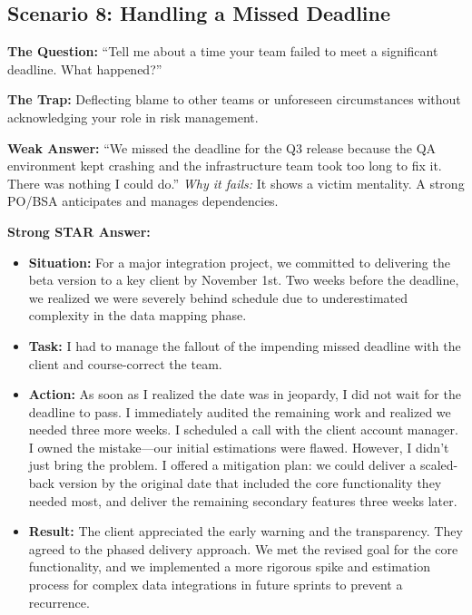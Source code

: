 \documentclass[
  11pt,
  openany,
  oneside]{book}
\providecommand{\tightlist}{%
  \setlength{\itemsep}{0pt}\setlength{\parskip}{0pt}}
\begin{document}
\subsection{Scenario 8: Handling a Missed
Deadline}\label{scenario-8-handling-a-missed-deadline}

\textbf{The Question:} ``Tell me about a time your team failed to meet a
significant deadline. What happened?''

\textbf{The Trap:} Deflecting blame to other teams or unforeseen
circumstances without acknowledging your role in risk management.

\textbf{Weak Answer:} ``We missed the deadline for the Q3 release
because the QA environment kept crashing and the infrastructure team
took too long to fix it. There was nothing I could do.'' \emph{Why it
fails:} It shows a victim mentality. A strong PO/BSA anticipates and
manages dependencies.

\textbf{Strong STAR Answer:}

\begin{itemize}
\tightlist
\item
  \textbf{Situation:} For a major integration project, we committed to
  delivering the beta version to a key client by November 1st. Two weeks
  before the deadline, we realized we were severely behind schedule due
  to underestimated complexity in the data mapping phase.
\item
  \textbf{Task:} I had to manage the fallout of the impending missed
  deadline with the client and course-correct the team.
\item
  \textbf{Action:} As soon as I realized the date was in jeopardy, I did
  not wait for the deadline to pass. I immediately audited the remaining
  work and realized we needed three more weeks. I scheduled a call with
  the client account manager. I owned the mistake---our initial
  estimations were flawed. However, I didn't just bring the problem. I
  offered a mitigation plan: we could deliver a scaled-back version by
  the original date that included the core functionality they needed
  most, and deliver the remaining secondary features three weeks later.
\item
  \textbf{Result:} The client appreciated the early warning and the
  transparency. They agreed to the phased delivery approach. We met the
  revised goal for the core functionality, and we implemented a more
  rigorous spike and estimation process for complex data integrations in
  future sprints to prevent a recurrence.
\end{itemize}
\end{document}
